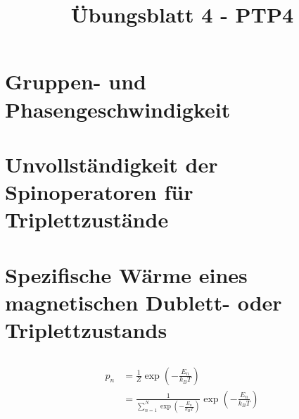 \documentclass[a4paper,11pt]{article}
\title{Übungsblatt 4 - PTP4}
\author{}
\date{}
\begin{document}
\maketitle

\section{Gruppen- und Phasengeschwindigkeit}

\subsection{}

\subsection{}

\subsection{}

\section{Unvollständigkeit der Spinoperatoren für Triplettzustände}

\subsection{}

\subsection{}

\section{Spezifische Wärme eines magnetischen Dublett- oder Triplettzustands}

\subsection{}

\begin{equation}
\begin{aligned}
p_n &= \frac{1}{Z} \exp \left( -\frac{E_n}{k_B T} \right) \\
    &= \frac{1}{\sum_{n=1}^N \exp \left( -\frac{E_n}{k_B T} \right)} \exp \left( -\frac{E_n}{k_B T} \right)
\end{aligned}
\end{equation}
\end{document}
